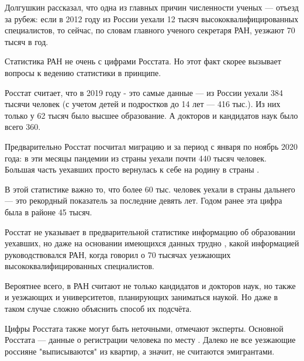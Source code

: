 Долгушкин рассказал, что одна из главных причин  численности ученых --- отъезд за рубеж: если в 2012 году из России уехали 12 тысяч высококвалифицированных специалистов, то сейчас, по словам главного ученого секретаря РАН, уезжают 70 тысяч в год.

Статистика РАН не очень  с цифрами Росстата. Но этот факт скорее вызывает вопросы к ведению статистики в принципе.

Росстат считает, что в 2019 году - это самые  данные --- из России уехали 384 тысячи человек (с учетом детей и подростков до 14 лет --- 416 тыс.). Из них только у 62 тысяч было высшее образование. А докторов и кандидатов наук было всего 360.

Предварительно Росстат посчитал миграцию и за период с января по ноябрь 2020 года: в эти месяцы пандемии из страны уехали почти 440 тысяч человек. Большая часть уехавших просто вернулась к себе на родину в страны .


В этой статистике важно то, что более 60 тыс. человек уехали в страны дальнего  --- это рекордный показатель за последние девять лет. Годом ранее эта цифра была в районе 45 тысяч.

Росстат не указывает в предварительной статистике информацию об образовании уехавших, но даже на основании имеющихся данных трудно , какой информацией руководствовался РАН, когда говорил о 70 тысячах уезжающих высококвалифицированных специалистов.

Вероятнее всего, в РАН считают не только кандидатов и докторов наук, но также и уезжающих  и  университетов, планирующих заниматься наукой. Но даже в таком случае сложно объяснить способ их подсчёта.

Цифры Росстата также могут быть неточными, отмечают эксперты. Основной  Росстата --- данные о регистрации человека по месту . Далеко не все уезжающие россияне "выписываются" из квартир, а значит, не считаются эмигрантами.

